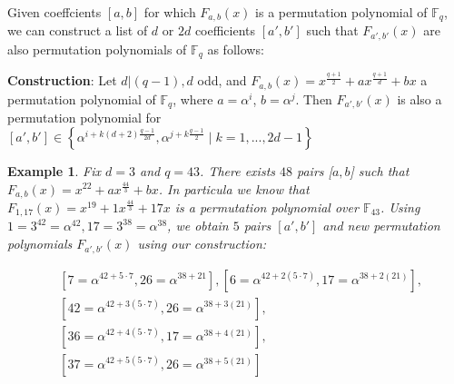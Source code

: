 \documentclass[landscape,final,paperwidth=48in,paperheight=38in]{baposter}
\newtheorem{example}{Example}
\begin{document}
\begin{poster}
{    Given coeffcients $[a,b]$ for which $F_{a,b}(x)$ is a permutation polynomial of $\mathbb{F}_q$, we can construct a list of $d$ or $2d$ coefficients $[a',b']$ such that $F_{a',b'}(x)$ are also permutation polynomials of $\mathbb{F}_q$ as follows:

    \vspace{1em}
    
    \textbf{Construction}: Let $d|(q-1), d$ odd, and $F_{a,b}(x) = x^{\frac{q+1}{2}} + a x^{\frac{q+1}{d}} + b x$ a permutation polynomial of $\mathbb{F}_{q}$, where $a=\alpha^i$, $b=\alpha^j$. Then $F_{a',b'}(x)$ is also a permutation polynomial for $[a',b'] \in \left\{ \alpha^{i+k (d+2) \frac{q-1}{2d}}, \alpha^{j+k \frac{q-1}{2}} \mid k=1,...,2d-1 \right\}$

    \vspace{1em}

    \begin{example}
      Fix $d = 3$ and $q = 43$. There exists $48$ pairs [$a,b$] such that $F_{a,b}(x) = x^{22} + a x^{\frac{44}{3}} + b x$. In particula we know that $F_{1,17}(x) = x^{19} + 1 x^{\frac{44}{3}} + 17 x$ is a permutation polynomial over $\mathbb{F}_{43}$. Using $1=3^{42}=\alpha^{42}, 17= 3^{38}=\alpha^{38}$, we obtain $5$ pairs $[a', b']$ and new permutation polynomials $F_{a',b'}(x)$ using our construction:

      \vspace{-1.3em}

      \begin{align*}
        &[7=\alpha^{42+5\cdot 7},26=\alpha^{38+21}], [6=\alpha^{42+2(5\cdot 7)},17=\alpha^{38+2(21)}], \\
        &[42=\alpha^{42+3(5\cdot 7)},26=\alpha^{38+3(21)}], \\
        &[36=\alpha^{42+4(5\cdot 7)},17=\alpha^{38+4(21)}], \\ 
        &[37=\alpha^{42+5(5\cdot 7)},26=\alpha^{38+5(21)}]
      \end{align*}
    \end{example}

   \vspace{0.3em}
  }\label{Results}

\label{Applications}


\end{poster}
\end{document}
